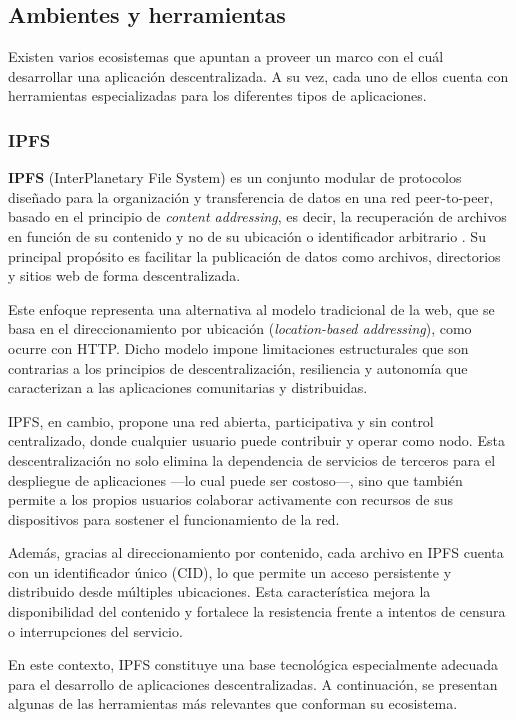 \subsection{Ambientes y herramientas}
Existen varios ecosistemas que apuntan a proveer un marco con el cuál desarrollar una aplicación descentralizada. A su vez, cada uno de ellos cuenta con herramientas especializadas para los diferentes tipos de aplicaciones.

\subsubsection{IPFS}

\textbf{IPFS} (InterPlanetary File System) es un conjunto modular de protocolos diseñado para la organización y transferencia de datos en una red peer-to-peer, basado en el principio de \textit{content addressing}, es decir, la recuperación de archivos en función de su contenido y no de su ubicación o identificador arbitrario \cite{ipfs}. Su principal propósito es facilitar la publicación de datos como archivos, directorios y sitios web de forma descentralizada.

Este enfoque representa una alternativa al modelo tradicional de la web, que se basa en el direccionamiento por ubicación (\textit{location-based addressing}), como ocurre con HTTP. Dicho modelo impone limitaciones estructurales que son contrarias a los principios de descentralización, resiliencia y autonomía que caracterizan a las aplicaciones comunitarias y distribuidas.

IPFS, en cambio, propone una red abierta, participativa y sin control centralizado, donde cualquier usuario puede contribuir y operar como nodo. Esta descentralización no solo elimina la dependencia de servicios de terceros para el despliegue de aplicaciones —lo cual puede ser costoso—, sino que también permite a los propios usuarios colaborar activamente con recursos de sus dispositivos para sostener el funcionamiento de la red.

Además, gracias al direccionamiento por contenido, cada archivo en IPFS cuenta con un identificador único (CID), lo que permite un acceso persistente y distribuido desde múltiples ubicaciones. Esta característica mejora la disponibilidad del contenido y fortalece la resistencia frente a intentos de censura o interrupciones del servicio.

En este contexto, IPFS constituye una base tecnológica especialmente adecuada para el desarrollo de aplicaciones descentralizadas. A continuación, se presentan algunas de las herramientas más relevantes que conforman su ecosistema.

